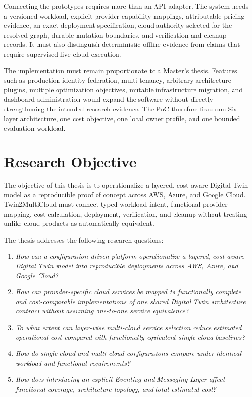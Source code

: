 Connecting the prototypes requires more than an API adapter. The system needs
a versioned workload, explicit provider capability mappings, attributable
pricing evidence, an exact deployment specification, cloud authority selected
for the resolved graph, durable mutation boundaries, and verification and
cleanup records. It must also distinguish deterministic offline evidence from
claims that require supervised live-cloud execution.

The implementation must remain proportionate to a Master's thesis. Features
such as production identity federation, multi-tenancy, arbitrary architecture
plugins, multiple optimization objectives, mutable infrastructure migration,
and dashboard administration would expand the software without directly
strengthening the intended research evidence. The PoC therefore fixes one
Six-layer architecture, one cost objective, one local owner profile, and one
bounded evaluation workload.

\section{Research Objective}

The objective of this thesis is to operationalize a layered, cost-aware
Digital Twin model as a reproducible proof of concept across AWS, Azure, and
Google Cloud. Twin2MultiCloud must connect typed workload intent, functional
provider mapping, cost calculation, deployment, verification, and cleanup
without treating unlike cloud products as automatically equivalent.

The thesis addresses the following research questions:

\begin{enumerate}
    \item[\textbf{RQ1}] \textit{How can a configuration-driven platform
    operationalize a layered, cost-aware Digital Twin model into reproducible
    deployments across AWS, Azure, and Google Cloud?}

    \item[\textbf{RQ2}] \textit{How can provider-specific cloud services be
    mapped to functionally complete and cost-comparable implementations of one
    shared Digital Twin architecture contract without assuming one-to-one
    service equivalence?}

    \item[\textbf{RQ3}] \textit{To what extent can layer-wise multi-cloud
    service selection reduce estimated operational cost compared with
    functionally equivalent single-cloud baselines?}

    \item[\textbf{RQ3.1}] \textit{How do single-cloud and multi-cloud
    configurations compare under identical workload and functional
    requirements?}

    \item[\textbf{RQ3.2}] \textit{How does introducing an explicit Eventing
    and Messaging Layer affect functional coverage, architecture topology, and
    total estimated cost?}
\end{enumerate}

